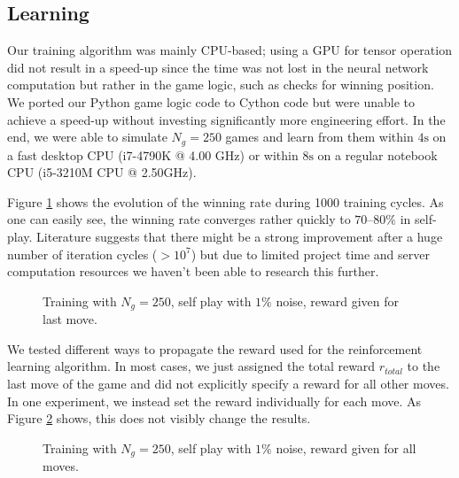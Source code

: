 \documentclass[10pt,twocolumn,letterpaper]{article}
\begin{document}
\subsection{Learning}
Our training algorithm was mainly CPU-based; using a GPU for tensor
operation did not result in a speed-up since the time was not lost in the neural
network computation but rather in the game logic, such as checks for winning position.
We ported our Python game logic code to Cython code but were
unable to achieve a speed-up without investing significantly more engineering effort.
In the end, we were able to simulate $N_g = 250$ games and learn from
them within $4\mathrm{s}$ on a fast desktop CPU (i7-4790K @ 4.00 GHz)
or within $8 \mathrm{s}$ on a regular notebook CPU (i5-3210M CPU @ 2.50GHz).

Figure \ref{fig:last_move_self_001} shows the evolution of the winning rate during
1000 training cycles.
As one can easily see, the winning rate converges rather quickly to $70–80 \%$ in self-play. Literature suggests that there might be a strong improvement after a huge number of iteration cycles ($> 10^7$) but due to limited project time and server computation resources we haven't been able to research this further.

\begin{figure}[t]
    \begin{center}
		\noindent
		\makebox[3.25in]{
	   		
		}
	\end{center}
    \caption{Training with $N_g=250$, self play with $1\%$ noise, reward given for last move.}
	\label{fig:last_move_self_001}
\end{figure}
We tested different ways to propagate the reward used for the reinforcement learning algorithm.
In most cases, we just assigned the total reward $r_{total}$ to the last move of the game and did not explicitly specify a reward for all other moves.
In one experiment, we instead set the reward individually for each move. %
As Figure \ref{fig:all_moves_self_001} shows, this does not visibly change the results.
\begin{figure}[t]
    \begin{center}
		\noindent
		\makebox[3.25in]{
	   		
		}
	\end{center}
    \caption{Training with $N_g=250$, self play with $1\%$ noise, reward given for all moves.}
	\label{fig:all_moves_self_001}
\end{figure}
\end{document}
